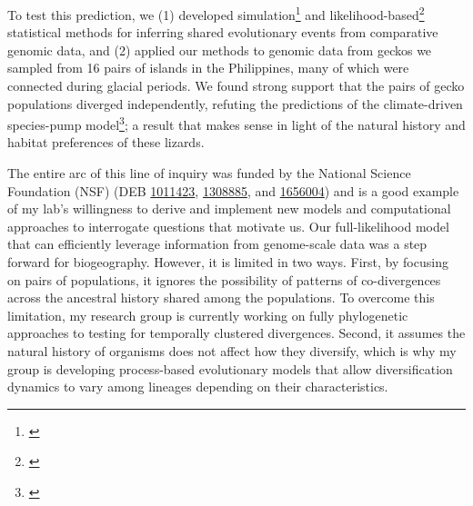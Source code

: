 To test this prediction, we
(1) developed
simulation\footnote{\label{Oaks14dpp}\hspace{-0.8em}}
and
likelihood-based\footnote{\label{Oaks18ecoevolity}\hspace{-0.8em}}
statistical methods for inferring shared evolutionary events from comparative
genomic data, and
(2) applied our methods to genomic data from geckos we sampled from 16 pairs of
islands in the Philippines, many of which were connected during glacial
periods.
We found strong support that the pairs of gecko populations diverged
independently,
refuting the predictions of the climate-driven species-pump
model\footnote{\label{Oaks18paic}\hspace{-0.8em}};
a result that makes sense in light of the natural history and habitat
preferences of these lizards.

The entire arc of this line of inquiry was funded by the National Science
Foundation (NSF)
(DEB
\href{https://www.nsf.gov/awardsearch/showAward?AWD_ID=1011423}{1011423},
\href{https://www.nsf.gov/awardsearch/showAward?AWD_ID=1308885}{1308885},
and
\href{https://www.nsf.gov/awardsearch/showAward?AWD_ID=1656004}{1656004})
and is a good example of my lab's willingness to derive and implement new
models and computational approaches to interrogate questions that motivate us.
Our full-likelihood model that can efficiently leverage information
from genome-scale data was a step forward for biogeography.
However,
it is limited in two ways.
First,
by focusing on pairs of populations, it ignores the possibility of patterns of
co-divergences across the ancestral history shared among the populations.
To overcome this limitation, my research group is currently working on fully
phylogenetic approaches to testing for temporally clustered divergences.
Second, it assumes the natural history of organisms does not affect how they
diversify, which is why my group is developing process-based evolutionary
models that allow diversification dynamics to vary among lineages depending on
their characteristics.

